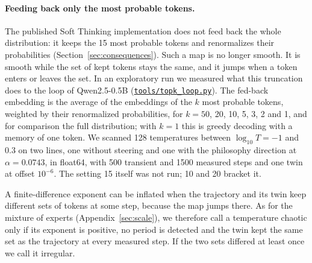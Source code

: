 \documentclass[11pt,letterpaper]{article}
\newcommand{\repourl}{https://github.com/tdj28/neural-shrimp}
\newcommand{\laterrepo}[1]{\href{\repourl/blob/0399fee2e9537a50993482aea8ec417e70286ac4/#1}{\nolinkurl{#1}}}
\begin{document}
\paragraph{Feeding back only the most probable tokens.} The published Soft Thinking implementation does not feed back
the whole distribution: it keeps the 15 most probable tokens and renormalizes their probabilities
(Section~\ref{sec:consequences}). Such a map is no longer smooth. It is smooth while the set of kept tokens stays the
same, and it jumps when a token enters or leaves the set. In an exploratory run we measured what this truncation does
to the loop of Qwen2.5-0.5B (\laterrepo{tools/topk_loop.py}). The fed-back embedding is the average of the embeddings
of the $k$ most probable tokens, weighted by their renormalized probabilities, for $k=50$, 20, 10, 5, 3, 2 and 1, and
for comparison the full distribution; with $k=1$ this is greedy decoding with a memory of one token. We scanned 128
temperatures between $\log_{10}T=-1$ and $0.3$ on two lines, one without steering and one with the philosophy
direction at $\alpha=0.0743$, in float64, with 500 transient and 1500 measured steps and one twin at offset $10^{-6}$.
The setting 15 itself was not run; 10 and 20 bracket it.

A finite-difference exponent can be inflated when the trajectory and its twin keep different sets of tokens at some
step, because the map jumps there. As for the mixture of experts (Appendix~\ref{sec:scale}), we therefore call a
temperature chaotic only if its exponent is positive, no period is detected and the twin kept the same set as the
trajectory at every measured step. If the two sets differed at least once we call it irregular.
\end{document}

